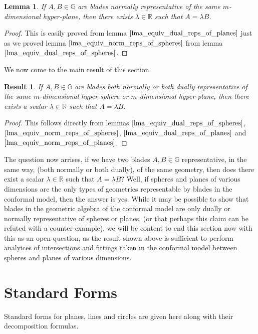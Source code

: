 \documentclass{article}
\newcommand{\R}{\mathbb{R}}
\newcommand{\G}{\mathbb{G}}
\newtheorem{lemma}{Lemma}[section]
\newtheorem{result}{Result}[section]
\begin{document}
\begin{lemma}\label{lma_equiv_norm_reps_of_planes}
If $A,B\in\G$ are blades normally representative of the same $m$-dimensional hyper-plane,
then there exists $\lambda\in\R$ such that $A=\lambda B$.
\end{lemma}
\begin{proof}
This is easily proved from lemma $\eqref{lma_equiv_dual_reps_of_planes}$ just as
we proved lemma $\eqref{lma_equiv_norm_reps_of_spheres}$ from lemma $\eqref{lma_equiv_dual_reps_of_spheres}$.
\end{proof}

We now come to the main result of this section.

\begin{result}\label{rslt_reinterp}
If $A,B\in\G$ are blades both normally or both dually representative of the same
$m$-dimensional hyper-sphere or $m$-dimensional hyper-plane, then there exists
a scalar $\lambda\in\R$ such that $A=\lambda B$.
\end{result}
\begin{proof}
This follows directly from lemmas $\eqref{lma_equiv_dual_reps_of_spheres}$,
$\eqref{lma_equiv_norm_reps_of_spheres}$, $\eqref{lma_equiv_dual_reps_of_planes}$ and
$\eqref{lma_equiv_norm_reps_of_planes}$.
\end{proof}

The question now arrises, if we have two blades $A,B\in\G$ representative, in the same way,
(both normally or both dually), of the same geometry, then does there exist a scalar
$\lambda\in\R$ such that $A=\lambda B$?  Well, if spheres and planes of various dimensions
are the only types of geometries representable by blades in the conformal model, then the
answer is yes.  While it may be possible to show that blades in the geometric algebra of
the conformal model are only dually or normally representative of spheres or planes,
(or that perhaps this claim can be refuted with a counter-example), we will be content
to end this section now with this as an open question, as the result shown above
is sufficient to perform analyices of intersections and fittings taken in the
conformal model between spheres and planes of various dimensions.

\section{Standard Forms}

Standard forms for planes, lines and circles are given here along
with their decomposition formulas.
\end{document}
